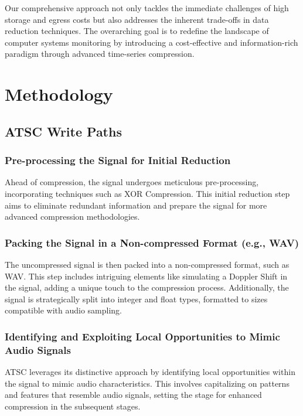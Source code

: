 \documentclass[conference]{IEEEtran}
\begin{document}

Our comprehensive approach not only tackles the immediate challenges of high storage and egress costs but also addresses the inherent trade-offs in data reduction techniques. The overarching goal is to redefine the landscape of computer systems monitoring by introducing a cost-effective and information-rich paradigm through advanced time-series compression. 



\section{Methodology}

\subsection{ATSC Write Paths}

\subsubsection{Pre-processing the Signal for Initial Reduction}
Ahead of compression, the signal undergoes meticulous pre-processing, incorporating techniques such as XOR Compression. This initial reduction step aims to eliminate redundant information and prepare the signal for more advanced compression methodologies.

\vspace{10pt}
\subsubsection{Packing the Signal in a Non-compressed Format (e.g., WAV)}
The uncompressed signal is then packed into a non-compressed format, such as WAV. This step includes intriguing elements like simulating a Doppler Shift in the signal, adding a unique touch to the compression process. Additionally, the signal is strategically split into integer and float types, formatted to sizes compatible with audio sampling. 

\vspace{10pt}
\subsubsection{Identifying and Exploiting Local Opportunities to Mimic Audio Signals}
ATSC leverages its distinctive approach by identifying local opportunities within the signal to mimic audio characteristics. This involves capitalizing on patterns and features that resemble audio signals, setting the stage for enhanced compression in the subsequent stages.
\end{document}
